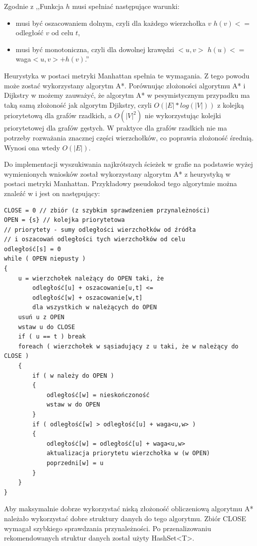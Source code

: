 \documentclass[a4paper,11pt,twoside,openright]{report}
\theoremstyle{definition}
\begin{document}
Zgodnie z \cite{AiSD2} ,,Funkcja $h$ musi spełniać następujące warunki:

\begin{itemize}[noitemsep]
\item musi być oszacowaniem dolnym, czyli dla każdego wierzchołka $v$ $h(v) <=$ odległość $v$ od celu $t$,
\item musi być monotoniczna, czyli dla dowolnej krawędzi $<u,v>$ $h(u) <= $waga$<u,v> + h(v)$.''
\end{itemize}

Heurystyka w postaci metryki Manhattan spełnia te wymagania. Z tego powodu może
zostać wykorzystany algorytm A*. Porównując złożoności algorytmu A* i Dijkstry w
\cite{AiSD2} możemy zauważyć, że algorytm A* w pesymistycznym przypadku ma taką
samą złożoność jak algorytm Djikstry, czyli $O(|E|*log(|V|))$ z kolejką priorytetową
dla grafów rzadkich, a $O(|V|^2)$ nie wykorzystując kolejki priorytetowej dla
grafów gęstych. W praktyce dla grafów rzadkich nie ma potrzeby rozważania znacznej
części wierzchołków, co poprawia złożoność średnią. Wynosi ona wtedy $O(|E|)$.

Do implementacji wyszukiwania najkrótszych ścieżek w grafie na podstawie wyżej
wymienionych wniosków został wykorzystany algorytm A* z heurystyką w postaci
metryki Manhattan. Przykładowy pseudokod tego algorytmie można znaleźć w
\cite{AiSD2} i jest on następujący: %

\begin{verbatim}
CLOSE = 0 // zbiór (z szybkim sprawdzeniem przynależności)
OPEN = {s} // kolejka priorytetowa
// priorytety - sumy odległości wierzchołków od źródła
// i oszacowań odległości tych wierzchołków od celu
odległość[s] = 0
while ( OPEN niepusty )
{
    u = wierzchołek należący do OPEN taki, że
        odległość[u] + oszacowanie[u,t] <=
        odległość[w] + oszacowanie[w,t]
        dla wszystkich w należących do OPEN
    usuń u z OPEN
    wstaw u do CLOSE
    if ( u == t ) break
    foreach ( wierzchołek w sąsiadujący z u taki, że w należący do CLOSE )
    {
        if ( w należy do OPEN )
        {
            odległość[w] = nieskończoność
            wstaw w do OPEN
        }
        if ( odległość[w] > odległość[u] + waga<u,w> )
        {
            odległość[w] = odległość[u] + waga<u,w>
            aktualizacja priorytetu wierzchołka w (w OPEN)
            poprzedni[w] = u
        }
    }
}
\end{verbatim}

Aby maksymalnie dobrze wykorzystać niską złożoność obliczeniową algorytmu A*
należało wykorzystać dobre struktury danych do tego algorytmu. Zbiór CLOSE
wymagał szybkiego sprawdzania przynależności. Po przenalizowaniu rekomendowanych
struktur danych \cite{Dotnet struktury} został użyty HashSet<T>.
\end{document}
